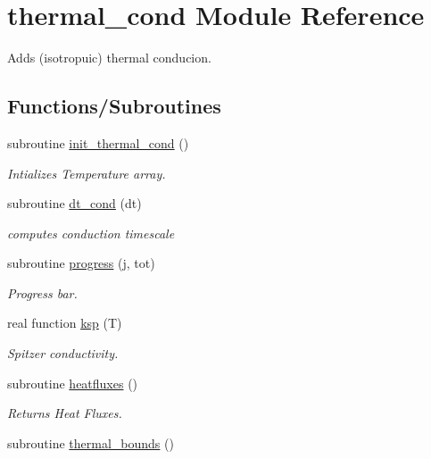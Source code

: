 \hypertarget{namespacethermal__cond}{}\section{thermal\+\_\+cond Module Reference}
\label{namespacethermal__cond}


Adds (isotropuic) thermal conducion.  


\subsection*{Functions/\+Subroutines}
\begin{DoxyCompactItemize}
\item 
subroutine \hyperlink{namespacethermal__cond_ac611766519a4602033c83e3ed5ae3c00}{init\+\_\+thermal\+\_\+cond} ()
\begin{DoxyCompactList}\small\item\em Intializes Temperature array. \end{DoxyCompactList}\item 
subroutine \hyperlink{namespacethermal__cond_a9e4afd71cbe737fe5189bc6ecbb3a61f}{dt\+\_\+cond} (dt)
\begin{DoxyCompactList}\small\item\em computes conduction timescale \end{DoxyCompactList}\item 
subroutine \hyperlink{namespacethermal__cond_a5283f7a2b8b4a4226ce624fb49445f43}{progress} (j, tot)
\begin{DoxyCompactList}\small\item\em Progress bar. \end{DoxyCompactList}\item 
real function \hyperlink{namespacethermal__cond_ab3978fb62e485cf71d7c83e779e92615}{ksp} (T)
\begin{DoxyCompactList}\small\item\em Spitzer conductivity. \end{DoxyCompactList}\item 
subroutine \hyperlink{namespacethermal__cond_abc5c4fc622aea2f85fc5a0c2fee333bc}{heatfluxes} ()
\begin{DoxyCompactList}\small\item\em Returns Heat Fluxes. \end{DoxyCompactList}\item 
subroutine \hyperlink{namespacethermal__cond_a55e65df0c700580f8af0a090063d2e32}{thermal\+\_\+bounds} ()

\end{DoxyCompactItemize}
